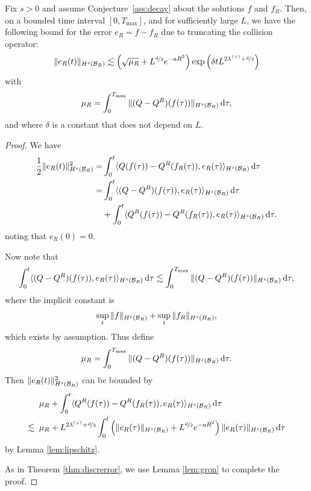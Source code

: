 \begin{proposition} \label{prop:err-R} Fix $s>0$ and assume Conjecture~\ref{ass:decay}
  about the solutions $f$ and $f_R$.  Then, on a bounded time interval
  $[0,T_\mathrm{max}]$, and for sufficiently large $L$, we have the following bound
  for the error $e_R=f-f_{R}$ due to truncating the collision operator:
  \begin{equation} \label{eqn:err-trunc}
        \|e_R(t)\|_{H^s(\mathcal{B}_R)} \lesssim \left( \sqrt{\mu_R}
          + L^{\nicefrac{d}{2}}e^{-aR^2}\right) 
        \exp\left(\delta t L^{2\lambda^{(+)}+\nicefrac{d}{2}}\right)
      \end{equation}
      with
      \[
      \mu_R = \int_0^{T_\mathrm{max}} \|(Q-Q^R)(f(\tau))\|_{H^s(\mathcal{B}_R)}\,\mathrm{d}\tau,
      \]
      and where $\delta$ is a constant that does not depend on $L$.
\end{proposition}
\begin{proof}
    We have
    \begin{align*}
        \frac{1}{2}
                \|e_R(t)\|_{H^s(\mathcal{B}_R)}^2 = & \int_0^t\langle Q(f(\tau)) -
                Q^R(f_R(\tau)), e_R(\tau)\rangle_{H^s(\mathcal{B}_R)} \,\mathrm{d} \tau \\
        = & \int_0^t \langle (Q-Q^R)(f(\tau)), e_R(\tau) \rangle_{H^s(\mathcal{B}_R)}
                \,\mathrm{d}\tau \\
                & + \int_0^t \langle Q^R(f(\tau)) - Q^R(f_R(\tau)),
                    e_R(\tau)\rangle_{H^s(\mathcal{B}_R)} \,\mathrm{d} \tau.
    \end{align*}
    noting that $e_R(0)=0$.

    Now note that
    \begin{align*}
        \int_0^t \langle (Q-Q^R)(f(\tau)), e_R(\tau) \rangle_{H^s(\mathcal{B}_R)}
                \,\mathrm{d}\tau \lesssim \int_0^{T_\mathrm{max}}
                \|(Q-Q^R)(f(\tau))\|_{H^s(\mathcal{B}_R)} \,\mathrm{d}\tau, 
    \end{align*}
    where the implicit constant is
    \[
        \sup_t \|f\|_{H^s(\mathcal{B}_R)} + \sup_t \|f_R\|_{H^s(B_R)},
    \]
    which exists by assumption. Thus define
    \[
        \mu_R = \int_0^{T_\mathrm{max}} \|(Q-Q^R)(f(\tau))\|_{H^s(\mathcal{B}_R)} \,\mathrm{d}\tau.
    \]
    Then $\|e_R(t)\|_{H^s(\mathcal{B}_R)}^2$ can be bounded by
    \begin{align*}
        & \mu_R + \int_0^t \langle
                Q^R(f(\tau)) - Q^R(f_R(\tau)), e_R(\tau) \rangle_{H^s(\mathcal{B}_R)}
                \,\mathrm{d} \tau \\
        \lesssim \;\; & \mu_R + L^{2\lambda^{(+)}+\nicefrac{d}{2}} \int_0^t \left(
                \|e_R(\tau)\|_{H^s(\mathcal{B}_R)} + L^{\nicefrac{d}{2}}e^{-aR^2}\right)
                \|e_R(\tau)\|_{H^s(\mathcal{B}_R)} \,\mathrm{d}\tau
    \end{align*}
    by Lemma \ref{lem:lipschitz}.

    As in Theorem \ref{thm:discrerror}, we use Lemma \ref{lem:gron} to complete
    the proof.
\end{proof}
